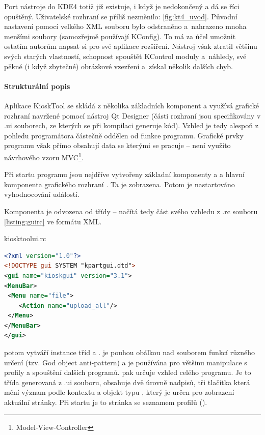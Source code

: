 Port nástroje do KDE4 totiž již existuje, i když je nedokončený a dá se říci opuštěný. Uživatelské rozhraní se příliš nezměnilo: \ref{fig:kt4_uvod}. Původní nastavení pomocí velkého XML souboru bylo odstraněno a~nahrazeno mnoha menšími soubory (samozřejmě používají KConfig). To má za účel umožnit ostatím autorům napsat si pro své aplikace rozšíření. Nástroj však ztratil většinu svých starých vlastností, schopnost spouštět KControl moduly a~náhledy, své pěkné (i když zbytečné) obrázkové vzezření a~získal několik dalších chyb.

\paragraph{Strukturální popis}
Aplikace KioskTool se skládá z několika základních komponent a využívá grafické rozhraní navržené pomocí nástroj Qt Designer (části rozhraní jsou specifikovány v .ui souborech, ze kterých se při kompilaci generuje kód). Vzhled je tedy alespoň z pohledu programátora  částečně oddělen od funkce programu. Grafické prvky programu však přímo obsahují data se kterými se pracuje -- není využito návrhového vzoru MVC\footnote{Model-View-Controller}.

Při startu programu jsou nejdříve vytvořeny základní komponenty  a  a hlavní komponenta grafického rozhraní . Ta je zobrazena. Potom je nastartováno vyhodnocování událostí.

Komponenta  je odvozena od třídy  -- načítá tedy část svého vzhledu z .rc souboru \ref{listing:guirc} ve formátu XML.
\begin{mylisting}
\caption{kiosktoolui.rc}
\label{listing:guirc}
\begin{lstlisting}[language=XML]
<?xml version="1.0"?>
<!DOCTYPE gui SYSTEM "kpartgui.dtd">
<gui name="kioskgui" version="3.1">
<MenuBar>
 <Menu name="file">
    <Action name="upload_all"/>
 </Menu>
</MenuBar>
</gui>
\end{lstlisting}
\end{mylisting}

 potom vytváří instance tříd  a .  je pouhou obálkou nad souborem funkcí různého určení (tzv. God object anti-pattern) a je používána pro většinu manipulace s profily a spouštění dalších programů.  pak určuje vzhled celého programu. Je to třída generovaná z .ui souboru, obsahuje dvě úrovně nadpisů, tři tlačítka která mění význam podle kontextu a objekt typu , který je určen pro zobrazení aktuální stránky. Při startu je to stránka se seznamem profilů ().

